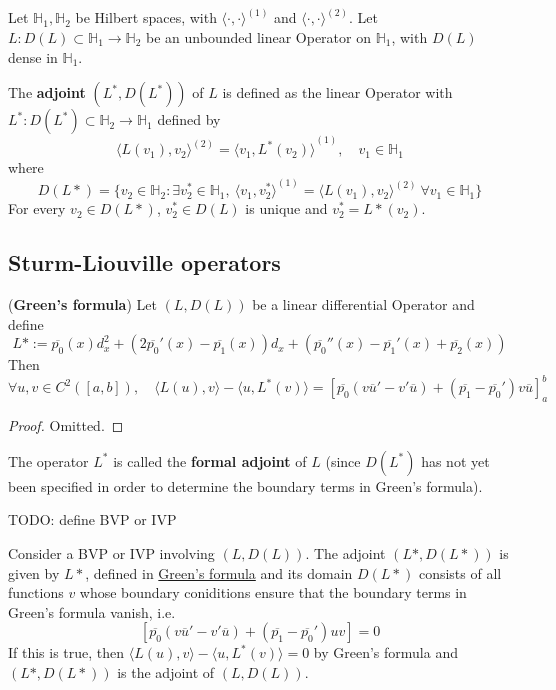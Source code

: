 \begin{definition}
	Let $\mathbb{H}_1, \mathbb{H}_2$ be Hilbert spaces, with ${\langle \cdot, \cdot \rangle}^{(1)}$ and ${\langle \cdot, \cdot \rangle}^{(2)}$. Let $L: D(L) \subset \mathbb{H}_1 \rightarrow \mathbb{H}_2$ be an unbounded linear Operator on $\mathbb{H}_1$, with $D(L)$ dense in $\mathbb{H}_1$.
	
	The \textbf{adjoint} $(L^*, D(L^*))$ of $L$ is defined as the linear Operator with $L^*: D(L^*) \subset \mathbb{H}_2 \rightarrow \mathbb{H}_1$ defined by
	\[
		{\langle L(v_1), v_2 \rangle}^{(2)} = {\langle v_1, L^* (v_2) \rangle}^{(1)}, \quad v_1 \in \mathbb{H}_1
	\]
	where
	\[
		D(L*) = \{ v_2 \in \mathbb{H}_2: \exists v_2^* \in \mathbb{H}_1, \  {\langle v_1, v_2^* \rangle}^{(1)} = {\langle L(v_1), v_2 \rangle}^{(2)} \ \forall v_1 \in \mathbb{H}_1 \}
	\]
	For every $v_2 \in D(L*)$, $v_2^* \in D(L)$ is unique and $v_2^* = L*(v_2)$.
\end{definition}

\subsection{Sturm-Liouville operators}

\begin{proposition}\label{prop:greensFormula}
	(\textbf{Green's formula}) Let $(L, D(L))$ be a linear differential Operator  and define
	\[
		L* := \overline{p_0} (x) d_x^2 + (2 \overline{p_0}'(x) - \overline{p_1}(x)) d_x + (\overline{p_0}''(x) - \overline{p_1}'(x) + \overline{p_2}(x))
	\]
	Then
	\[
		\forall u, v \in C^2 ([a, b]), \quad \langle L(u), v \rangle - \langle u, L^*(v) \rangle = {\left[ \overline{p_0} (v \overline{u}' - v' \overline{u}) + (\overline{p_1} - \overline{p_0}') v \overline{u} \right]}_a^b
	\]
\end{proposition}

\begin{proof}
	Omitted.
\end{proof}

\begin{definition}
	The operator $L^*$ is called the \textbf{formal adjoint} of $L$ (since $D(L^*)$ has not yet been specified in order to determine the boundary terms in Green's formula).
\end{definition}

TODO: define BVP or IVP

\begin{definition}
	Consider a BVP or IVP involving $(L, D(L))$. The adjoint $(L*, D(L*))$ is given by $L*$, defined in \hyperref[prop:greensFormula]{Green's formula} and its domain $D(L*)$ consists of all functions $v$ whose boundary coniditions ensure that the boundary terms in Green's formula vanish, i.e.
	\[
		\left[ \overline{p_0} (v \overline{u}' - v' \overline{u}) + (\overline{p_1} - \overline{p_0}') uv \right] = 0
	\]
	If this is true, then $\langle L(u), v \rangle - \langle u, L^*(v) \rangle = 0$ by Green's formula and $(L*, D(L*))$ is the adjoint of $(L, D(L))$.
\end{definition}

